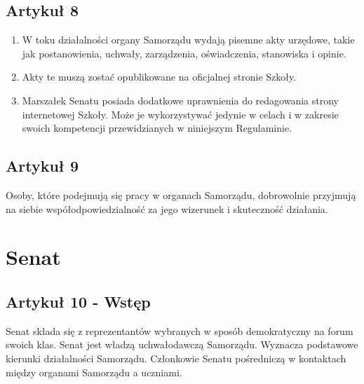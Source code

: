 \documentclass[14pt]{article}
\newenvironment{ustepy}{%
	\begin{enumerate}[leftmargin=1.5em, itemindent=1pt, labelwidth=1em, itemsep=5pt]
	}{%
	\end{enumerate}
}
\begin{document}
\subsection*{Artykuł 8}
\begin{ustepy}
\item W toku działalności organy Samorządu wydają pisemne akty urzędowe, takie jak postanowienia, uchwały, zarządzenia, oświadczenia, stanowiska i opinie.
\item Akty te muszą zostać opublikowane na oficjalnej stronie Szkoły. 
\item Marszałek Senatu posiada dodatkowe uprawnienia do redagowania strony internetowej Szkoły. Może je wykorzystywać jedynie w celach i w zakresie swoich kompetencji przewidzianych w niniejszym Regulaminie.
\end{ustepy}

\subsection*{Artykuł 9}
Osoby, które podejmują się pracy w organach Samorządu, dobrowolnie przyjmują na siebie współodpowiedzialność za jego wizerunek i skuteczność działania. 

\section{Senat}
\subsection*{Artykuł 10 - Wstęp}
Senat składa się z reprezentantów wybranych w sposób demokratyczny na forum swoich klas. Senat jest władzą uchwałodawczą Samorządu. Wyznacza podstawowe kierunki działalności Samorządu. Członkowie Senatu pośredniczą w kontaktach między organami Samorządu a uczniami.
\end{document}
